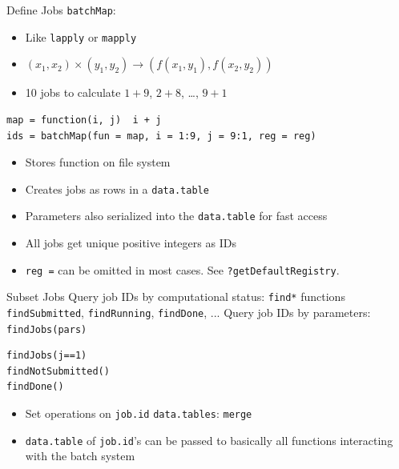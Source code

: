 \documentclass[11pt,compress,t,notes=noshow, aspectratio=169, xcolor=table]{beamer}
\begin{document}
\begin{frame}[fragile]{Define Jobs}
  \texttt{batchMap}:
  \begin{itemize}
    \item Like \texttt{lapply} or \texttt{mapply}
    \item \((x_1, x_2) \times (y_1, y_2) \rightarrow ( f(x_1, y_1), f(x_2, y_2) )\)
    \item 10 jobs to calculate \(1+9\), \(2+8\), \ldots, \(9+1\)
  \end{itemize}
  
\begin{lstlisting}
map = function(i, j)  i + j
ids = batchMap(fun = map, i = 1:9, j = 9:1, reg = reg)
\end{lstlisting}
  
  \begin{itemize}
    \item Stores function on file system
    \item Creates jobs as rows in a \texttt{data.table}
    \item Parameters also serialized into the \texttt{data.table} for fast access
    \item All jobs get unique positive integers as IDs
    \item \texttt{reg =} can be omitted in most cases. See \texttt{?getDefaultRegistry}.
  \end{itemize}
\end{frame}

\begin{frame}[fragile]{Subset Jobs}
  Query job IDs by computational status: \texttt{find*} functions \texttt{findSubmitted}, \texttt{findRunning}, \texttt{findDone}, ...
  Query job IDs by parameters: \texttt{findJobs(pars)}
  
\begin{lstlisting}
findJobs(j==1)
findNotSubmitted()
findDone()
\end{lstlisting}
  
  \begin{itemize}
    \item Set operations on \texttt{job.id} \texttt{data.tables}: \texttt{merge}
    \item \texttt{data.table} of \texttt{job.id}'s can be passed to basically all functions interacting with the batch system
  \end{itemize}
\end{frame}
\end{document}
